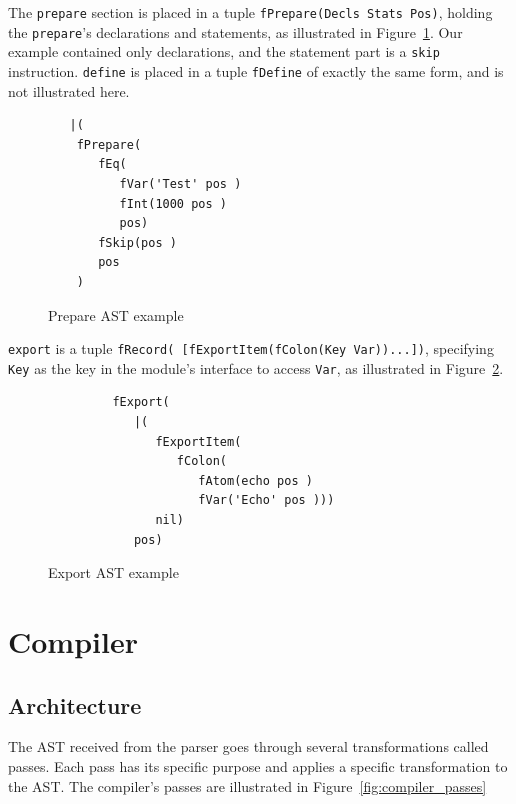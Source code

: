 \documentclass[a4paper]{memoir}
\begin{document}
The \lstinline!prepare! section is placed in a tuple 
\lstinline!fPrepare(Decls Stats Pos)!, holding the \lstinline!prepare!'s
declarations and statements, as illustrated in
Figure~\ref{fig:functor_example_prepare}.
Our example contained only declarations, and the statement part is a \lstinline!skip! instruction.
\lstinline!define! is placed in a tuple \lstinline!fDefine! of exactly the same form, and is not illustrated here.

\begin{figure}[ht]
\begin{lstlisting}
   |(
    fPrepare(
       fEq(
          fVar('Test' pos )
          fInt(1000 pos )
          pos)
       fSkip(pos )
       pos
    )

\end{lstlisting}
\caption{Prepare AST example}
\label{fig:functor_example_prepare}
\end{figure}

\lstinline!export! is a tuple 
\lstinline!fRecord( [fExportItem(fColon(Key Var))...])!, specifying
\lstinline!Key! as the key in the module's interface to access
\lstinline!Var!, as illustrated in Figure~\ref{fig:functor_example_export}.

\begin{figure}[h]
\begin{lstlisting}
         fExport(
            |(
               fExportItem(
                  fColon(
                     fAtom(echo pos )
                     fVar('Echo' pos )))
               nil)
            pos)
\end{lstlisting}
\caption{Export AST example}
\label{fig:functor_example_export}
\end{figure}





\chapter{Compiler}
\section{Architecture}
The AST received from the parser goes through several transformations called
passes. Each pass has its specific purpose and applies a specific
transformation to the AST. The compiler's passes are illustrated in Figure~\ref{fig:compiler_passes}
\end{document}
